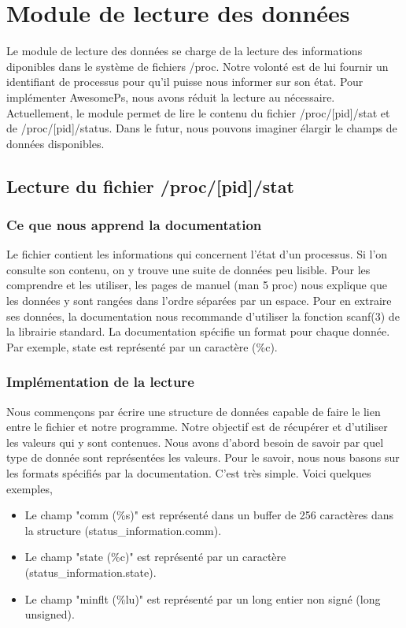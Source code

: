 \section{Module de lecture des données}
Le module de lecture des données se charge de la lecture des informations diponibles dans le système de fichiers /proc. Notre volonté est de lui fournir un identifiant de processus pour qu'il puisse nous informer sur son état. Pour implémenter AwesomePs, nous avons réduit la lecture au nécessaire. Actuellement, le module permet de lire le contenu du fichier /proc/[pid]/stat et de /proc/[pid]/status. Dans le futur, nous pouvons imaginer élargir le champs de données disponibles.

\subsection{Lecture du fichier /proc/[pid]/stat}
\subsubsection{Ce que nous apprend la documentation}
Le fichier contient les informations qui concernent l’état d'un processus. Si l'on consulte son contenu, on y trouve une suite de données peu lisible.
Pour les comprendre et les utiliser, les pages de manuel (man 5 proc) nous explique que les données y sont rangées dans l'ordre séparées par un espace. Pour en extraire ses données, la documentation nous recommande d'utiliser la fonction scanf(3) de la librairie standard. La documentation spécifie un format pour chaque donnée. Par exemple, state est représenté par un caractère (\%c).

\subsubsection{Implémentation de la lecture}
Nous commençons par écrire une structure de données capable de faire le lien entre le fichier et notre programme. Notre objectif est de récupérer et d’utiliser les valeurs qui y sont contenues.
Nous avons d’abord besoin de savoir par quel type de donnée sont représentées les valeurs. Pour le savoir, nous nous basons sur les formats spécifiés par la documentation. C’est très simple. Voici quelques exemples,

\begin{itemize}
\item Le champ "comm (\%s)" est représenté dans un buffer de 256 caractères dans la structure (status\_information.comm).
\item Le champ "state (\%c)" est représenté par un caractère (status\_information.state).
\item Le champ "minflt (\%lu)" est représenté par un long entier non signé (long unsigned).
\end{itemize}

